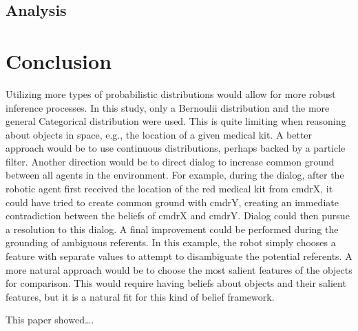 \documentclass[12pt]{article}
\begin{document}
\subsection{Analysis}
\label{sec:analysis}

\section{Conclusion}
\label{sec:conclusion}


Utilizing more types of probabilistic distributions would allow for
more robust inference processes. In this study, only a Bernoulii
distribution and the more general Categorical distribution were
used. This is quite limiting when reasoning about objects in space,
e.g., the location of a given medical kit. A better approach would be
to use continuous distributions, perhaps backed by a particle filter.
Another direction would be to direct dialog to increase common
ground between all agents in the environment. For example, during the
dialog, after the robotic agent first received the location of the
red medical kit from cmdrX, it could have tried to create common
ground with cmdrY, creating an immediate contradiction between the
beliefs of cmdrX and cmdrY. Dialog could then pursue a resolution to
this dialog. A final improvement could be performed during the
grounding of ambiguous referents. In this example, the robot simply
chooses a feature with separate values to attempt to disambiguate the
potential referents. A more natural approach would be to choose the
most salient features of the objects for comparison. This would
require having beliefs about objects and their salient features, but
it is a natural fit for this kind of belief framework.

This paper showed\dots.
 {\small }
\end{document}
